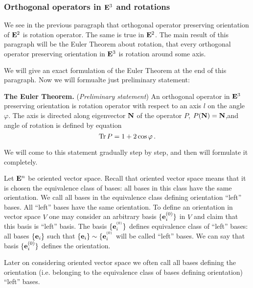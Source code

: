 \documentclass[12pt]{article}
\numberwithin{equation}{section}
\begin{document}
 

\subsubsection{Orthogonal operators in ${\bf E}^3$ and rotations}

  We see in the previous paragraph that
orthogonal operator preserving orientation of ${\bf E}^2$
is rotation operator.  The same is true in ${\bf E}^2$.
  The main result of this paragraph will be
 the Euler Theorem about rotation, that every orthogonal operator preserving
orientation in ${\bf E}^3$ is rotation around some axis. 
  
We will give an exact formulation of
 the Euler  Theorem at the end
of this paragraph. Now we will formualte 
 just preliminary statement:

  {\bf The Euler Theorem.} ({\sl Preliminary statement})
 An orthogonal operator in ${\bf E}^3$ preserving orientation is 
rotation operator with respect to an axis $l$ on the angle $\varphi$.
The axis is directed along  eigenvector 
${\bf N}$ of the operator $P$, $P({\bf N})={\bf N}$,and angle of rotation
is defined by equation
             $$
      {\rm Tr\,}P=1+2\cos\varphi\,.
             $$




We will come to this statement gradually step by step,
and then  will formulate it completely.


Let ${\bf E}^n$ be oriented vector space. Recall that oriented 
vector space means
    that it is chosen the equivalence class of bases: all 
bases in this class have the same orientation.
    We call all bases in the equivalence class defining orientation 
``left'' bases.
    All ``left'' bases have the same orientation.
    To define an orientation in vector space $V$ one may consider an arbitrary basis $\{{\bf e}^{(0)}_i\}$ in
    $V$ and claim that this basis is ``left''
    basis. The basis $\{{\bf e}^{^{(0)}}_i\}$ defines equivalence class of ``left'' bases:
    all bases $\{{\bf e}_i\}$ such that $\{{\bf e}_i\}\sim \{{\bf e}_i^{^{(0)}}$ will be called ``left'' bases.
     We  can say that basis  $\{{\bf e}_i^{(0)}\}$ defines the orientation.

    Later on considering oriented vector space we often
  call all bases defining the orientation 
(i.e. belonging to the equivalence
class of bases defining orientation) ``left'' bases.
\end{document}
